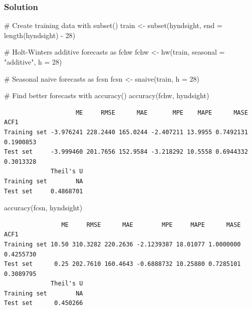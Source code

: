\documentclass[
  letterpaper,
  DIV=11,
  numbers=noendperiod]{scrartcl}
\newenvironment{Shaded}{\begin{snugshade}}{\end{snugshade}}
\newcommand{\AttributeTok}[1]{\textcolor[rgb]{0.40,0.45,0.13}{#1}}
\newcommand{\CommentTok}[1]{\textcolor[rgb]{0.37,0.37,0.37}{#1}}
\newcommand{\DecValTok}[1]{\textcolor[rgb]{0.68,0.00,0.00}{#1}}
\newcommand{\FunctionTok}[1]{\textcolor[rgb]{0.28,0.35,0.67}{#1}}
\newcommand{\NormalTok}[1]{\textcolor[rgb]{0.00,0.23,0.31}{#1}}
\newcommand{\OtherTok}[1]{\textcolor[rgb]{0.00,0.23,0.31}{#1}}
\newcommand{\SpecialCharTok}[1]{\textcolor[rgb]{0.37,0.37,0.37}{#1}}
\newcommand{\StringTok}[1]{\textcolor[rgb]{0.13,0.47,0.30}{#1}}
\begin{document}
\hypertarget{solution-1}{%
\subsubsection{Solution}\label{solution-1}}

\begin{Shaded}
\begin{Highlighting}[]
\CommentTok{\# Create training data with subset()}
\NormalTok{train }\OtherTok{\textless{}{-}} \FunctionTok{subset}\NormalTok{(hyndsight, }\AttributeTok{end =} \FunctionTok{length}\NormalTok{(hyndsight) }\SpecialCharTok{{-}} \DecValTok{28}\NormalTok{)}

\CommentTok{\# Holt{-}Winters additive forecasts as fchw}
\NormalTok{fchw }\OtherTok{\textless{}{-}} \FunctionTok{hw}\NormalTok{(train, }\AttributeTok{seasonal =} \StringTok{"additive"}\NormalTok{, }\AttributeTok{h =} \DecValTok{28}\NormalTok{)}

\CommentTok{\# Seasonal naive forecasts as fcsn}
\NormalTok{fcsn }\OtherTok{\textless{}{-}} \FunctionTok{snaive}\NormalTok{(train, }\AttributeTok{h =} \DecValTok{28}\NormalTok{)}

\CommentTok{\# Find better forecasts with accuracy()}
\FunctionTok{accuracy}\NormalTok{(fchw, hyndsight)}
\end{Highlighting}
\end{Shaded}

\begin{verbatim}
                    ME     RMSE      MAE       MPE    MAPE      MASE      ACF1
Training set -3.976241 228.2440 165.0244 -2.407211 13.9955 0.7492131 0.1900853
Test set     -3.999460 201.7656 152.9584 -3.218292 10.5558 0.6944332 0.3013328
             Theil's U
Training set        NA
Test set     0.4868701
\end{verbatim}

\begin{Shaded}
\begin{Highlighting}[]
\FunctionTok{accuracy}\NormalTok{(fcsn, hyndsight)}
\end{Highlighting}
\end{Shaded}

\begin{verbatim}
                ME     RMSE      MAE        MPE     MAPE      MASE      ACF1
Training set 10.50 310.3282 220.2636 -2.1239387 18.01077 1.0000000 0.4255730
Test set      0.25 202.7610 160.4643 -0.6888732 10.25880 0.7285101 0.3089795
             Theil's U
Training set        NA
Test set      0.450266
\end{verbatim}
\end{document}
